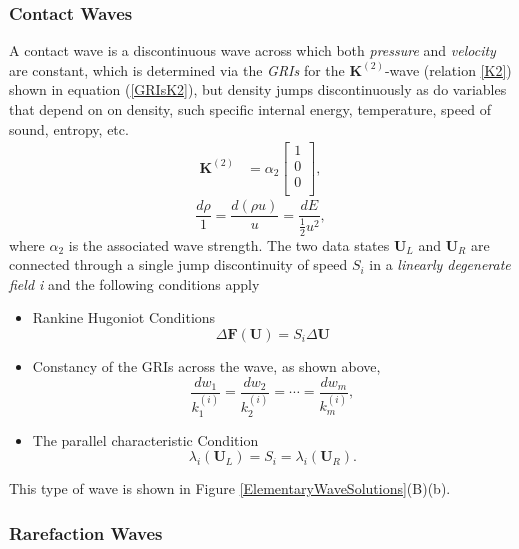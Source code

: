 \documentclass[]{article}
\begin{document}
		\subsubsection{Contact Waves}
			A contact wave is a discontinuous wave across which both \textit{pressure} and \textit{velocity} are constant, which is determined via the \textit{GRIs} for the $ \textbf{K}^{(2)} $-wave (relation \ref{K2}) shown in equation (\ref{GRIsK2}), but density jumps discontinuously as do variables that depend on on density, such specific internal energy, temperature, speed of sound, entropy, etc.
			\begin{align}
				\textbf{K}^{(2)} &= \alpha_2 \begin{bmatrix}
				1 \\
				0 \\
				0 \\
				\end{bmatrix},
				\label{K2}				
			\end{align}
			\begin{equation}
				\frac{d \rho}{1} = \frac{d(\rho u)}{u} = \frac{dE}{\frac{1}{2}u^2}
				\label{GRIsK2},
			\end{equation}
			where $ \alpha_2 $ is the associated wave strength.
			The two data states $ \textbf{U}_L $ and $ \textbf{U}_R $ are connected through a single jump discontinuity of speed $ S_i $  in a \textit{linearly degenerate field i} and the following conditions apply
			\begin{itemize}
				\item Rankine Hugoniot Conditions
				\begin{equation}
					\Delta \textbf{F}(\textbf{U}) = S_i \Delta 	\textbf{U}
				\end{equation}
				\item Constancy of the GRIs across the wave, as shown above,
				\begin{equation}
					\frac{dw_1}{k_1^{(i)}} = \frac{dw_2}{k_2^{(i)}} = \cdots = \frac{dw_m}{k_m^{(i)}},
				\end{equation}
				\item The parallel characteristic Condition
				\begin{equation}
					\lambda_i(\textbf{U}_L) = S_i = \lambda_i(\textbf{U}_R).
				\end{equation}
			\end{itemize}
			This type of wave is shown in Figure \ref{ElementaryWaveSolutions}(B)(b).
		
		\subsubsection{Rarefaction Waves}
		
\end{document}
